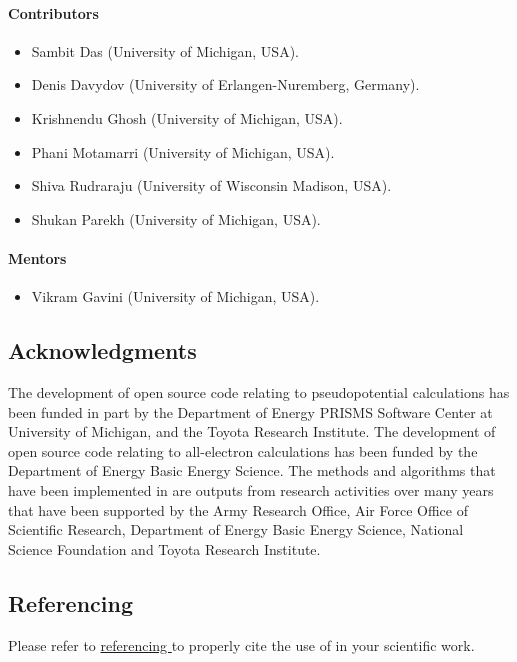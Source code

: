 \paragraph{Contributors}
\begin{itemize}
	\item Sambit Das (University of Michigan, USA).
	\item Denis Davydov (University of Erlangen-Nuremberg, Germany).
	\item Krishnendu Ghosh (University of Michigan, USA).
	\item Phani Motamarri (University of Michigan, USA).
	\item Shiva Rudraraju (University of Wisconsin Madison, USA).
	\item Shukan Parekh (University of Michigan, USA). 	
\end{itemize}

\paragraph{Mentors}
\begin{itemize}
	\item Vikram Gavini (University of Michigan, USA).
\end{itemize}

\subsection{Acknowledgments}
The development of \dftfe{} open source code relating to pseudopotential calculations has been funded in part by the Department 
of Energy PRISMS Software Center at University of Michigan, and the Toyota Research Institute. The development of \dftfe{} open 
source code relating to all-electron calculations has been funded by the Department of Energy Basic Energy Science. The methods 
and algorithms that have been implemented in \dftfe{} are outputs from research activities over many years that have been 
supported by the Army Research Office, Air Force Office of Scientific Research, Department of Energy Basic Energy Science, 
National Science Foundation and Toyota Research Institute. 

\subsection{Referencing \dftfe{}}
Please refer to \href{https://sites.google.com/umich.edu/dftfe/referencing}{referencing  \dftfe{}} to properly cite the use of 
\dftfe{} in your scientific work. 
